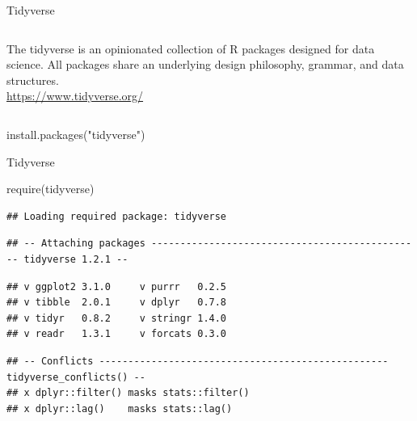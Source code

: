 \documentclass[14pt,ignorenonframetext,]{bredelebeamer}
\newenvironment{Shaded}{\begin{snugshade}}{\end{snugshade}}
\newcommand{\KeywordTok}[1]{\textcolor[rgb]{0.94,0.87,0.69}{#1}}
\newcommand{\StringTok}[1]{\textcolor[rgb]{0.80,0.58,0.58}{#1}}
\newcommand{\NormalTok}[1]{\textcolor[rgb]{0.80,0.80,0.80}{#1}}
\begin{document}
\begin{frame}[fragile]{Tidyverse}
\begin{columns}
\begin{column}{0.7\textwidth}
    \begin{Large}
        The tidyverse is an opinionated collection of R packages designed for data science. All packages share an underlying design philosophy, grammar, and data structures.\\
        \url{https://www.tidyverse.org/}
    \end{Large}


    
    \end{column}
\end{columns}

\begin{Shaded}
\begin{Highlighting}[]
\KeywordTok{install.packages}\NormalTok{(}\StringTok{"tidyverse"}\NormalTok{)}
\end{Highlighting}
\end{Shaded}

\end{frame}

\begin{frame}[fragile]{Tidyverse}

\small

\begin{Shaded}
\begin{Highlighting}[]
\KeywordTok{require}\NormalTok{(tidyverse)}
\end{Highlighting}
\end{Shaded}

\begin{verbatim}
## Loading required package: tidyverse
\end{verbatim}

\begin{verbatim}
## -- Attaching packages ----------------------------------------------- tidyverse 1.2.1 --
\end{verbatim}

\begin{verbatim}
## v ggplot2 3.1.0     v purrr   0.2.5
## v tibble  2.0.1     v dplyr   0.7.8
## v tidyr   0.8.2     v stringr 1.4.0
## v readr   1.3.1     v forcats 0.3.0
\end{verbatim}

\begin{verbatim}
## -- Conflicts -------------------------------------------------- tidyverse_conflicts() --
## x dplyr::filter() masks stats::filter()
## x dplyr::lag()    masks stats::lag()
\end{verbatim}

\end{frame}
\end{document}
